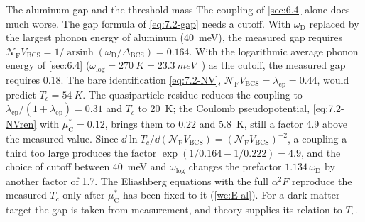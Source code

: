 \begin{workedexample}{The aluminum gap and the threshold mass}
The coupling of \cref{sec:6.4} alone does much worse. The gap formula of \cref{eq:7.2-gap} needs a cutoff. With $\omega_{\mathrm{D}}$ replaced by the largest phonon energy of aluminum (\SI{40}{meV}), the measured gap requires $\mathcal{N}_{\mathrm{F}}V_{\mathrm{BCS}} = 1/\operatorname{arsinh}(\omega_{\mathrm{D}}/\Delta_{\mathrm{BCS}}) = 0.164$. With the logarithmic average phonon energy of \cref{sec:6.4} ($\omega_{\log} = \SI{270}{K} = \SI{23.3}{meV}$~\cite[Table~III]{savrasov1996electron}) as the cutoff, the measured gap requires 0.18. The bare identification \cref{eq:7.2-NV}, $\mathcal{N}_{\mathrm{F}}V_{\mathrm{BCS}} = \lambda_{\mathrm{ep}} = 0.44$, would predict $T_c = \SI{54}{K}$. The quasiparticle residue reduces the coupling to $\lambda_{\mathrm{ep}}/(1 + \lambda_{\mathrm{ep}}) = 0.31$ and $T_c$ to \SI{20}{K}; the Coulomb pseudopotential, \cref{eq:7.2-NVren} with $\mu^*_{\mathrm{C}} = 0.12$, brings them to 0.22 and \SI{5.8}{K}, still a factor 4.9 above the measured value. Since $\dd\ln T_c/\dd(\mathcal{N}_{\mathrm{F}}V_{\mathrm{BCS}}) = (\mathcal{N}_{\mathrm{F}}V_{\mathrm{BCS}})^{-2}$, a coupling a third too large produces the factor $\exp(1/0.164 - 1/0.222) = 4.9$, and the choice of cutoff between \SI{40}{meV} and $\omega_{\log}$ changes the prefactor $1.134\,\omega_{\mathrm{D}}$ by another factor of 1.7. The Eliashberg equations with the full $\alpha^2F$ reproduce the measured $T_c$ only after $\mu^*_{\mathrm{C}}$ has been fixed to it (\cref{we:E-al}). For a dark-matter target the gap is taken from measurement, and theory supplies its relation to $T_c$.
\end{workedexample}
